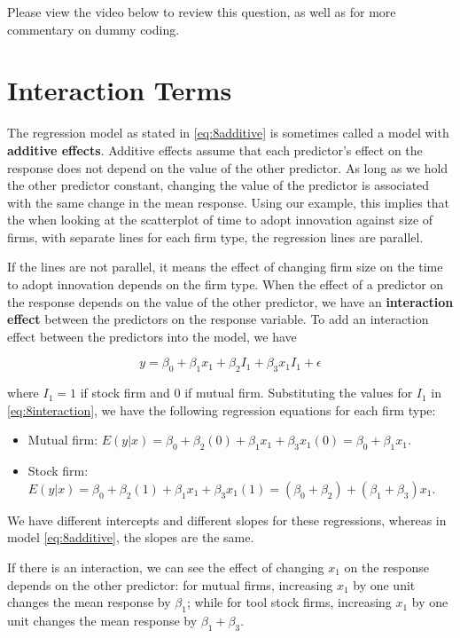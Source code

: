 \documentclass[
]{book}
\begin{document}
Please view the video below to review this question, as well as for more commentary on dummy coding.

\hypertarget{interaction-terms}{%
\section{Interaction Terms}\label{interaction-terms}}

The regression model as stated in \eqref{eq:8additive} is sometimes called a model with \textbf{additive effects}. Additive effects assume that each predictor's effect on the response does not depend on the value of the other predictor. As long as we hold the other predictor constant, changing the value of the predictor is associated with the same change in the mean response. Using our example, this implies that the when looking at the scatterplot of time to adopt innovation against size of firms, with separate lines for each firm type, the regression lines are parallel.

If the lines are not parallel, it means the effect of changing firm size on the time to adopt innovation depends on the firm type. When the effect of a predictor on the response depends on the value of the other predictor, we have an \textbf{interaction effect} between the predictors on the response variable. To add an interaction effect between the predictors into the model, we have

\begin{equation} 
y = \beta_0 + \beta_1x_{1} + \beta_2I_1 + \beta_3 x_1 I_1 + \epsilon
\label{eq:8interaction}
\end{equation}

where \(I_1 = 1\) if stock firm and 0 if mutual firm. Substituting the values for \(I_1\) in \eqref{eq:8interaction}, we have the following regression equations for each firm type:

\begin{itemize}
\item
  Mutual firm: \(E(y|x) = \beta_0+\beta_2(0)+\beta_1x_1+\beta_3 x_1(0)=\beta_0+\beta_1x_1.\)
\item
  Stock firm: \(E(y|x) = \beta_0+\beta_2(1)+\beta_1x_1+\beta_3 x_1(1)=(\beta_0+\beta_2)+(\beta_1+\beta_3)x_1.\)
\end{itemize}

We have different intercepts and different slopes for these regressions, whereas in model \eqref{eq:8additive}, the slopes are the same.

If there is an interaction, we can see the effect of changing \(x_1\) on the response depends on the other predictor: for mutual firms, increasing \(x_1\) by one unit changes the mean response by \(\beta_1\); while for tool stock firms, increasing \(x_1\) by one unit changes the mean response by \(\beta_1 + \beta_3\).
\end{document}
